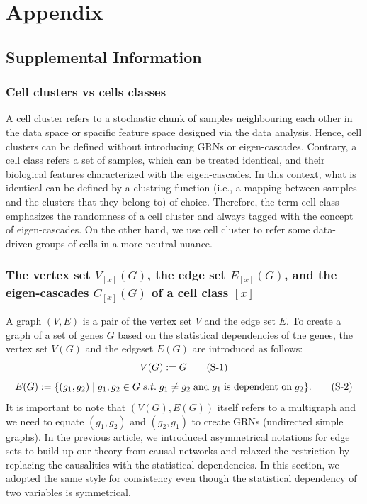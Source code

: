 \documentclass{article}
\title{\empty}
\author{\empty}
\date{\empty}
\begin{document}
\maketitle

\section*{Appendix}
\subsection*{Supplemental Information}
\subsubsection*{Cell clusters vs cells classes}
A cell cluster refers to a stochastic chunk of samples neighbouring each other in the data space or spacific feature 
space designed via the data analysis. Hence, cell clusters can be defined without introducing GRNs or eigen-cascades. 
Contrary, a cell class refers a set of samples, which can be treated identical, and their biological features 
characterized with the eigen-cascades. In this context, what is identical can be defined by a clustring function (i.e., 
a mapping between samples and the clusters that they belong to) of choice. Therefore, the term cell class 
emphasizes the randomness of a cell cluster and always tagged with the concept of eigen-cascades. On the other hand, 
we use cell cluster to refer some data-driven groups of cells in a more neutral nuance.

\subsubsection*{
  The vertex set $V_{[x]}(G)$, the edge set $E_{[x]}(G)$, and the eigen-cascades $C_{[x]}(G)$ of a cell class $[x]$
}
A graph $(V, E)$ is a pair of the vertex set $V$ and the edge set $E$. To create a graph of a 
set of genes $G$ based on the statistical dependencies of the genes, the vertex set $V(G)$ and the 
edgeset $E(G)$ are introduced as follows:
\begin{equation}\label{V}
  V(G):=G \stepcounter{equation} \tag{S-\theequation}
\end{equation}
\begin{equation}\label{E}
  E(G):=\{(g_1, g_2)\;|\;g_1,g_2\in G\; s.t. \;g_1\neq g_2\;\text{and}\; g_1\;\text{is dependent on}\;g_2\}.
  \stepcounter{equation} \tag{S-\theequation}
\end{equation}
It is important to note that $(V(G),E(G))$ itself refers to a multigraph and we need to equate $(g_1,g_2)$ 
and $(g_2,g_1)$ to create GRNs (undirected simple graphs). In the previous article, we introduced 
asymmetrical notations for edge sets to build up our theory from causal networks and relaxed 
the restriction by replacing the causalities with the statistical dependencies. In this section, 
we adopted the same style for consistency even though the statistical dependency of two variables is symmetrical.
\end{document}
